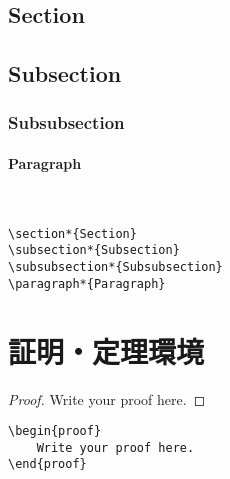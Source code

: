\documentclass[dvipdfmx,uplatex,b5j,8pt,nomag*]{jsarticle}
\begin{document}
\begin{multicols}{2}
\section*{Section}
\subsection*{Subsection}
\subsubsection*{Subsubsection}
\paragraph*{Paragraph}\mbox{}\\

\columnbreak

\begin{lstlisting}
\section*{Section}
\subsection*{Subsection}
\subsubsection*{Subsubsection}
\paragraph*{Paragraph}
\end{lstlisting}

\end{multicols}



\newpage
\section{証明・定理環境}

\begin{multicols}{2}
\begin{proof}
    Write your proof here. 
\end{proof}

\columnbreak

\begin{lstlisting}
\begin{proof}
    Write your proof here. 
\end{proof}
\end{lstlisting}
\end{multicols}
\end{document}
